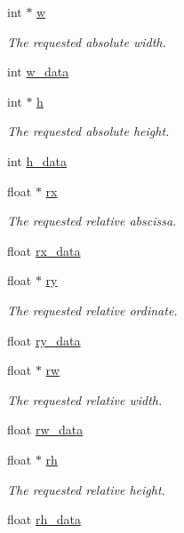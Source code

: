 \begin{DoxyCompactItemize}
int $\ast$ \hyperlink{structei__placer__params__t_a62adb2fa9ee168ab6959d84a3baa4b91}{w}
\begin{DoxyCompactList}\small\item\em The requested absolute width. \end{DoxyCompactList}\item 
int \hyperlink{structei__placer__params__t_ae94c6bc5f4422f5fd7418e7a6e428a8a}{w\+\_\+data}
\item 
int $\ast$ \hyperlink{structei__placer__params__t_ab1f1683f0e5ff5b10881851f7de923b5}{h}
\begin{DoxyCompactList}\small\item\em The requested absolute height. \end{DoxyCompactList}\item 
int \hyperlink{structei__placer__params__t_af2ea394033d83268def0c71659aece7a}{h\+\_\+data}
\item 
float $\ast$ \hyperlink{structei__placer__params__t_a8570c9a80c6f3f0672a667c53348c698}{rx}
\begin{DoxyCompactList}\small\item\em The requested relative abscissa. \end{DoxyCompactList}\item 
float \hyperlink{structei__placer__params__t_a9155db861dc404336cc12888041ecc8d}{rx\+\_\+data}
\item 
float $\ast$ \hyperlink{structei__placer__params__t_a71edc6f4e83a892a55cbe3430d7cf1b7}{ry}
\begin{DoxyCompactList}\small\item\em The requested relative ordinate. \end{DoxyCompactList}\item 
float \hyperlink{structei__placer__params__t_a2055b1dcc667420769afe2121c964242}{ry\+\_\+data}
\item 
float $\ast$ \hyperlink{structei__placer__params__t_a9155d4067029e8c2a1f7a3f0af35036e}{rw}
\begin{DoxyCompactList}\small\item\em The requested relative width. \end{DoxyCompactList}\item 
float \hyperlink{structei__placer__params__t_a6541ed8c3c577fab040286a7d42b4595}{rw\+\_\+data}
\item 
float $\ast$ \hyperlink{structei__placer__params__t_a54a438796f9ce98d6abe1b0406db2981}{rh}
\begin{DoxyCompactList}\small\item\em The requested relative height. \end{DoxyCompactList}\item 
float \hyperlink{structei__placer__params__t_aa4b888e5ade5aff39206f658b8171351}{rh\+\_\+data}
\end{DoxyCompactItemize}


